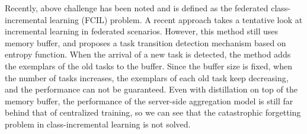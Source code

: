 \documentclass[sigconf,anonymous,review,screen]{acmart}
\begin{document}
Recently, above challenge has been noted and is defined as the federated class-incremental learning (FCIL) problem. A recent approach \cite{dong2022federated} takes a tentative look at incremental learning in federated scenarios. However, this method still uses memory buffer, and proposes a task transition detection mechanism based on entropy function. When the arrival of a new task is detected, the method adds the exemplars of the old tasks to the buffer. Since the buffer size is fixed, when the number of tasks increases, the exemplars of each old task keep decreasing, and the performance can not be guaranteed. Even with distillation on top of the memory buffer, the performance of the server-side aggregation model is still far behind that of centralized training, so we can see that the catastrophic forgetting problem \cite{mccloskey1989catastrophic} in class-incremental learning is not solved.

%
\end{document}

